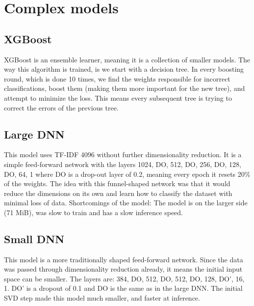 \section{Complex models}
\subsection{XGBoost}
XGBoost is an ensemble learner, meaning it is a collection of smaller models. The way this algorithm is trained, is we start with a decision tree. In every boosting round, which is done 10 times, we find the weights responsible for incorrect classifications, boost them (making them more important for the new tree), and attempt to minimize the loss. This means every subsequent tree is trying to correct the errors of the previous tree.

\subsection{Large DNN}
This model uses TF-IDF 4096 without further dimensionality reduction. It is a simple feed-forward network with the
layers 1024, DO, 512, DO, 256, DO, 128, DO, 64, 1 where DO is a drop-out layer of 0.2, meaning every epoch it resets 20\%
of the weights. The idea with this funnel-shaped network was that it would reduce the dimensions on its own and learn
how to classify the dataset with minimal loss of data. Shortcomings of the model: The model is on the larger side (71 MiB), was slow to train and has a slow inference speed.

\subsection{Small DNN}
This model is a more traditionally shaped feed-forward network. Since the data was passed through dimensionality reduction
already, it means the initial input space can be smaller. The layers are: 384, DO, 512, DO, 512, DO, 128, DO', 16, 1.
DO' is a dropout of 0.1 and DO is the same as in the large DNN. The initial SVD step made this model much smaller, and faster at inference.
